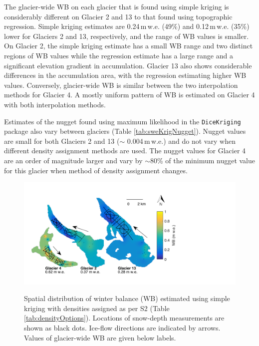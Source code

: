 \documentclass{sfuthesis}
\begin{document}
{The glacier-wide WB on each glacier that is found using simple kriging is considerably different on Glacier 2 and 13 to that found using topographic regression. Simple kriging estimates are 0.24\,m\,w.e. (49\%) and 0.12\,m\,w.e. (35\%) lower for Glaciers 2 and 13, respectively, and the range of WB values is smaller. On Glacier 2, the simple kriging estimate has a small WB range and two distinct regions of WB values while the regression estimate has a large range and a significant elevation gradient in accumulation. Glacier 13 also shows considerable differences in the accumulation area, with the regression estimating higher WB values. Conversely, glacier-wide WB is similar between the two interpolation methods for Glacier 4. A mostly uniform pattern of WB is estimated on Glacier 4 with both interpolation methods.

Estimates of the nugget found using maximum likelihood in the \texttt{DiceKriging} package also vary between glaciers (Table \ref{tab:sweKrigNugget}). Nugget values are small for both Glaciers 2 and 13 ($\sim$ 0.004\,m\,w.e.) and do not vary when different density assignment methods are used. The nugget values for Glacier 4 are an order of magnitude larger and vary by $\sim$80\% of the minimum nugget value for this glacier when method of density assignment changes. 

\begin{figure}[H]
	\centering
	\includegraphics[width =0.9 \textwidth]{SK_map.pdf}\\
	\caption[Spatial distribution of winter balance (WB) estimated using simple kriging with densities assigned as per S2]{Spatial distribution of winter balance (WB) estimated using simple kriging with densities assigned as per S2 (Table \ref{tab:densityOptions}). Locations of snow-depth measurements are shown as black dots. Ice-flow directions are indicated by arrows. Values of glacier-wide WB are given below labels.}
	\label{fig:sweKRIGING}
\end{figure}

}
\end{document}
